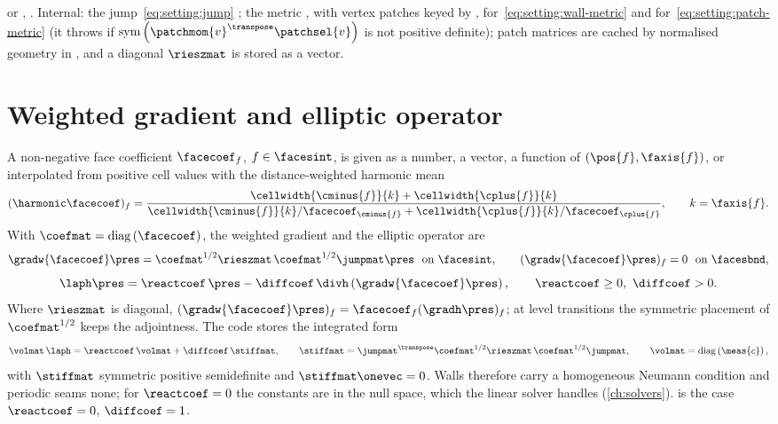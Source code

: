 \begin{implnote}
 or ,
. Internal: the jump~\cref{eq:setting:jump}
; the metric
, with vertex
patches keyed by ,
for~\cref{eq:setting:wall-metric} and
for~\cref{eq:setting:patch-metric} (it throws if
$\sym{\patchmom{v}^{\transpose}\patchsel{v}}$ is not positive definite);
patch matrices are cached by normalised geometry in
, and a diagonal
$\rieszmat$ is stored as a vector.
\end{implnote}

\section{Weighted gradient and elliptic operator}\label{sec:setting:elliptic}
A non-negative face coefficient $\facecoef_f$, $f\in\facesint$, is given as a
number, a vector, a function of $(\pos{f},\faxis{f})$, or interpolated from
positive cell values with the distance-weighted harmonic mean
\begin{equation}\label{eq:setting:harmonic}
  (\harmonic\facecoef)_f=\frac{\cellwidth{\cminus{f}}{k}+\cellwidth{\cplus{f}}{k}}
    {\cellwidth{\cminus{f}}{k}/\facecoef_{\cminus{f}}+\cellwidth{\cplus{f}}{k}/\facecoef_{\cplus{f}}},
  \qquad k=\faxis{f}.
\end{equation}
With $\coefmat=\diag{\facecoef}$, the weighted gradient and the elliptic
operator are
\begin{equation}\label{eq:setting:weighted-gradient}
  \gradw{\facecoef}\pres=\coefmat^{1/2}\rieszmat\,\coefmat^{1/2}\jumpmat\pres\ \text{ on }\facesint,
  \qquad (\gradw{\facecoef}\pres)_f=0\ \text{ on }\facesbnd,
\end{equation}
\begin{equation}\label{eq:setting:elliptic}
  \laph\pres=\reactcoef\,\pres-\diffcoef\,\divh\roundpar{\gradw{\facecoef}\pres},
  \qquad \reactcoef\ge0,\ \diffcoef>0 .
\end{equation}
Where $\rieszmat$ is diagonal,
$(\gradw{\facecoef}\pres)_f=\facecoef_f(\gradh\pres)_f$; at level transitions
the symmetric placement of $\coefmat^{1/2}$ keeps the adjointness. The code
stores the integrated form
\begin{equation}\label{eq:setting:stiffness}
  \volmat\,\laph=\reactcoef\,\volmat+\diffcoef\,\stiffmat,\qquad
  \stiffmat=\jumpmat^{\transpose}\coefmat^{1/2}\rieszmat\,\coefmat^{1/2}\jumpmat,
  \qquad \volmat=\diag{\meas{c}},
\end{equation}
with $\stiffmat$ symmetric positive semidefinite and $\stiffmat\onevec=0$.
Walls therefore carry a homogeneous Neumann condition and periodic seams none;
for $\reactcoef=0$ the constants are in the null space, which the linear
solver handles (\cref{ch:solvers}).  is the case
$\reactcoef=0$, $\diffcoef=1$.

